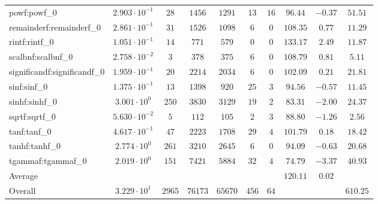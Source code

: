 \begin{tabular}{|l|c|c|c|c|c|c|c|c|c|}
powf:powf\_0                 & $ 2.903 \cdot 10^{-1} $ & $ 28     $ & $ 1456  $ & $ 1291  $ & $ 13  $ & $ 16 $ & $ 96.44       $ & $ -0.37   $ & $ 51.51   $ \\
remainderf:remainderf\_0     & $ 2.861 \cdot 10^{-1} $ & $ 31     $ & $ 1526  $ & $ 1098  $ & $ 6   $ & $ 0  $ & $ 108.35      $ & $ 0.77    $ & $ 11.29   $ \\
rintf:rintf\_0               & $ 1.051 \cdot 10^{-1} $ & $ 14     $ & $ 771   $ & $ 579   $ & $ 0   $ & $ 0  $ & $ 133.17      $ & $ 2.49    $ & $ 11.87   $ \\
scalbnf:scalbnf\_0           & $ 2.758 \cdot 10^{-2} $ & $ 3      $ & $ 378   $ & $ 375   $ & $ 6   $ & $ 0  $ & $ 108.79      $ & $ 0.81    $ & $ 5.11    $ \\
significandf:significandf\_0 & $ 1.959 \cdot 10^{-1} $ & $ 20     $ & $ 2214  $ & $ 2034  $ & $ 6   $ & $ 0  $ & $ 102.09      $ & $ 0.21    $ & $ 21.81   $ \\
sinf:sinf\_0                 & $ 1.375 \cdot 10^{-1} $ & $ 13     $ & $ 1398  $ & $ 920   $ & $ 25  $ & $ 3  $ & $ 94.56       $ & $ -0.57   $ & $ 11.45   $ \\
sinhf:sinhf\_0               & $ 3.001 \cdot 10^{0}  $ & $ 250    $ & $ 3830  $ & $ 3129  $ & $ 19  $ & $ 2  $ & $ 83.31       $ & $ -2.00   $ & $ 24.37   $ \\
sqrtf:sqrtf\_0               & $ 5.630 \cdot 10^{-2} $ & $ 5      $ & $ 112   $ & $ 105   $ & $ 2   $ & $ 3  $ & $ 88.80       $ & $ -1.26   $ & $ 2.56    $ \\
tanf:tanf\_0                 & $ 4.617 \cdot 10^{-1} $ & $ 47     $ & $ 2223  $ & $ 1708  $ & $ 29  $ & $ 4  $ & $ 101.79      $ & $ 0.18    $ & $ 18.42   $ \\
tanhf:tanhf\_0               & $ 2.774 \cdot 10^{0}  $ & $ 261    $ & $ 3210  $ & $ 2645  $ & $ 6   $ & $ 0  $ & $ 94.09       $ & $ -0.63   $ & $ 20.68   $ \\
tgammaf:tgammaf\_0           & $ 2.019 \cdot 10^{0}  $ & $ 151    $ & $ 7421  $ & $ 5884  $ & $ 32  $ & $ 4  $ & $ 74.79       $ & $ -3.37   $ & $ 40.93   $ \\
\hline
Average                      & $                     $ & $        $ & $       $ & $       $ & $     $ & $    $ & $ 120.11      $ & $ 0.02    $ & $         $ \\
\hline
Overall                      & $ 3.229 \cdot 10^{1}  $ & $ 2965   $ & $ 76173 $ & $ 65670 $ & $ 456 $ & $ 64 $ & $             $ & $         $ & $ 610.25  $ \\
\hline
\end{tabular}
